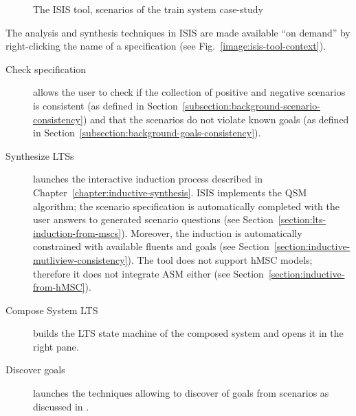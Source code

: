 \begin{figure}
\centering{}
  \caption{The ISIS tool, scenarios of the train system case-study\label{image:isis-tool}}
\end{figure}

The analysis and synthesis techniques in ISIS are made available ``on demand'' by right-clicking the name of a specification (see Fig.~\ref{image:isis-tool-context}).
\begin{description}
\item[Check specification] allows the user to check if the collection of positive and negative scenarios is consistent (as defined in Section~\ref{subsection:background-scenario-consistency}) and that the scenarios do not violate known goals (as defined in Section~\ref{subsection:background-goals-consistency}).
\item[Synthesize LTSs] launches the interactive induction process described in Chapter~\ref{chapter:inductive-synthesis}. ISIS implements the QSM algorithm; the scenario specification is automatically completed with the user answers to generated scenario questions (see Section~\ref{section:lts-induction-from-mscs}). Moreover, the induction is automatically constrained with available fluents and goals (see Section~\ref{section:inductive-mutliview-consistency}). The tool does not support hMSC models; therefore it does not integrate ASM either (see Section~\ref{section:inductive-from-hMSC}).
\item[Compose System LTS] builds the LTS state machine of the composed system and opens it in the right pane.
\item[Discover goals] launches the techniques allowing to discover of goals from scenarios as discussed in \cite{Damas:2006, Damas:2011}.
\end{description}

